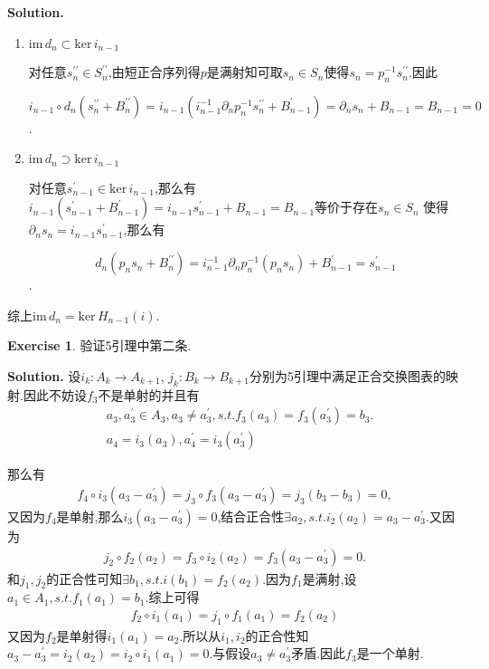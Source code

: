 \documentclass[a4paper]{book}
\newenvironment{solution}%
{\noindent\textbf{Solution.}}%
{\qedhere}
\numberwithin{equation}{chapter}
\theoremstyle{definition}
\newtheorem{exc}[exm]{Exercise}
\begin{document}
\begin{solution}
	\begin{enumerate}
		\item $ \text{im}\, d_n \subset \text{ker}\, i_{n-1} $
		
		对任意$ s^{\prime\prime}_n \in S_n^{\prime\prime} $,由短正合序列得$p$是满射知可取$s_n \in S_n$使得$s_n = p^{-1}_{n} s^{\prime \prime}_n$.因此
		
		\[ i_{n-1} \circ d_n(s_n^{\prime \prime} + B^{\prime \prime}_n) = i_{n-1}(i^{-1}_{n-1}\partial_n p^{-1}_n s^{\prime \prime}_n + B^\prime_{n-1}) = \partial_n s_n + B_{n-1} = B_{n-1} = 0\].
		
		\item  $ \text{im}\, d_n \supset \text{ker}\, i_{n-1} $
		
		对任意$ s^\prime_{n-1} \in \text{ker}\, i_{n-1} $,那么有$ i_{n-1}(s^\prime_{n-1} + B^\prime_{n-1}) = i_{n-1}s^\prime_{n-1} + B_{n-1} = B_{n-1} $等价于存在$s_n \in S_n$ 使得 $\partial_n s_n = i_{n-1} s^\prime_{n-1}$,那么有
		
		\[d_n(p_n s_n + B^{\prime\prime}_{n}) = i^{-1}_{n-1} \partial_n p^{-1}_{n} (p_n s_n) + B^\prime_{n-1} = s^\prime_{n-1}\].
	\end{enumerate}
综上$ \text{im}\, d_n = \text{ker}\, H_{n-1}(i) $.
\end{solution}

\begin{exc}
	验证5引理中第二条.
\end{exc}


\begin{solution}
	设$ i_k \colon A_k \rightarrow A_{k+1} $, $ j_k \colon B_k \rightarrow B_{k+1} $分别为5引理中满足正合交换图表的映射.因此不妨设$ f_3 $不是单射的并且有
	\begin{align*} 
	&a_3, a^\prime_3 \in A_3, a_3 \not= a_3^\prime  ,s.t. f_3(a_3) = f_3(a^\prime_3) = b_3. \\
	&a_4 = i_3(a_3), a_4^\prime = i_3(a_3^\prime)
	\end{align*}
	
	那么有 
	\begin{align*}
	f_4 \circ i_3(a_3 - a_3^\prime) = j_3 \circ f_3(a_3 - a_3^\prime) = j_3(b_3 - b_3) = 0,
	\end{align*}
	又因为$ f_4 $是单射,那么$ i_3(a_3 - a_3^\prime) = 0 $,结合正合性$ \exists a_2,s.t. i_2(a_2) = a_3 - a_3^\prime $.又因为
	\begin{align*}
		j_2 \circ f_2(a_2) = f_3 \circ i_2(a_2) = f_3(a_3 - a_3^\prime) = 0.
	\end{align*}
	和$ j_1,j_2 $的正合性可知$ \exists b_1,s.t. i(b_1) = f_2(a_2) $.因为$ f_1 $是满射,设$ a_1 \in A_1,s.t. f_1(a_1) = b_1 $.综上可得
	\begin{align*}
		f_2 \circ i_1(a_1) = j_1 \circ f_1(a_1) = f_2(a_2)
	\end{align*}
	又因为$ f_2 $是单射得$ i_1(a_1) = a_2 $.所以从$ i_1,i_2 $的正合性知$ a_3 - a_3^\prime = i_2(a_2) = i_2 \circ i_1(a_1) = 0 $.与假设$ a_3 \not= a_3^\prime $矛盾.因此$ f_3 $是一个单射.
\end{solution}
\end{document}
